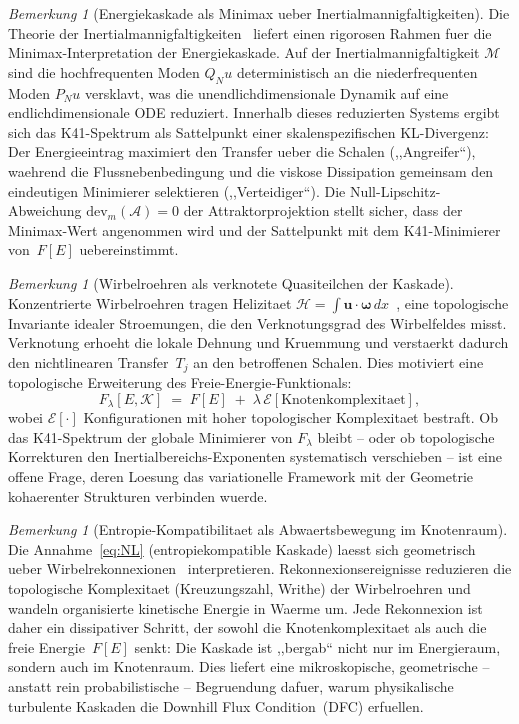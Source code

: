 \documentclass[12pt,a4paper]{article}
\theoremstyle{definition}
\theoremstyle{plain}
\theoremstyle{remark}
\newtheorem{remark}[definition]{Bemerkung}
\begin{document}
\begin{remark}[Energiekaskade als Minimax ueber Inertialmannigfaltigkeiten]
\label{rem:minimax-inertial}
Die Theorie der Inertialmannigfaltigkeiten~\cite{FoiasSellTemam88} liefert einen
rigorosen Rahmen fuer die Minimax-Interpretation der Energiekaskade. Auf der
Inertialmannigfaltigkeit $\mathcal{M}$ sind die hochfrequenten Moden $Q_N u$
deterministisch an die niederfrequenten Moden $P_N u$ versklavt, was die
unendlichdimensionale Dynamik auf eine endlichdimensionale ODE reduziert.
Innerhalb dieses reduzierten Systems ergibt sich das K41-Spektrum als
Sattelpunkt einer skalenspezifischen KL-Divergenz: Der Energieeintrag maximiert
den Transfer ueber die Schalen (,,Angreifer``), waehrend die Flussnebenbedingung
und die viskose Dissipation gemeinsam den eindeutigen Minimierer selektieren
(,,Verteidiger``). Die Null-Lipschitz-Abweichung
$\mathrm{dev}_m(\mathcal{A}) = 0$ der Attraktorprojektion stellt sicher, dass
der Minimax-Wert angenommen wird und der Sattelpunkt mit dem K41-Minimierer
von~$F[E]$ uebereinstimmt.
\end{remark}

\begin{remark}[Wirbelroehren als verknotete Quasiteilchen der Kaskade]
\label{rem:vortex-tubes}
Konzentrierte Wirbelroehren tragen Helizitaet
$\mathcal{H} = \int \mathbf{u} \cdot \boldsymbol{\omega}\, dx$~\cite{Moffatt69},
eine topologische Invariante idealer Stroemungen, die den Verknotungsgrad des
Wirbelfeldes misst. Verknotung erhoeht die lokale Dehnung und Kruemmung und
verstaerkt dadurch den nichtlinearen Transfer~$T_j$ an den betroffenen Schalen.
Dies motiviert eine topologische Erweiterung des Freie-Energie-Funktionals:
\[
  F_\lambda[E, \mathcal{K}] \;=\; F[E] \;+\; \lambda\, \mathcal{E}[\text{Knotenkomplexitaet}],
\]
wobei $\mathcal{E}[\cdot]$ Konfigurationen mit hoher topologischer Komplexitaet
bestraft. Ob das K41-Spektrum der globale Minimierer von $F_\lambda$ bleibt --
oder ob topologische Korrekturen den Inertialbereichs-Exponenten systematisch
verschieben -- ist eine offene Frage, deren Loesung das variationelle Framework
mit der Geometrie kohaerenter Strukturen verbinden wuerde.
\end{remark}

\begin{remark}[Entropie-Kompatibilitaet als Abwaertsbewegung im Knotenraum]
\label{rem:downhill-knot}
Die Annahme~\eqref{eq:NL} (entropiekompatible Kaskade) laesst sich geometrisch
ueber Wirbelrekonnexionen~\cite{Moffatt69, ArnoldKhesin98} interpretieren.
Rekonnexionsereignisse reduzieren die topologische Komplexitaet (Kreuzungszahl,
Writhe) der Wirbelroehren und wandeln organisierte kinetische Energie in Waerme
um. Jede Rekonnexion ist daher ein dissipativer Schritt, der sowohl die
Knotenkomplexitaet als auch die freie Energie~$F[E]$ senkt: Die Kaskade ist
,,bergab`` nicht nur im Energieraum, sondern auch im Knotenraum. Dies liefert
eine mikroskopische, geometrische -- anstatt rein probabilistische --
Begruendung dafuer, warum physikalische turbulente Kaskaden die Downhill Flux
Condition~(DFC) erfuellen.
\end{remark}
\end{document}
